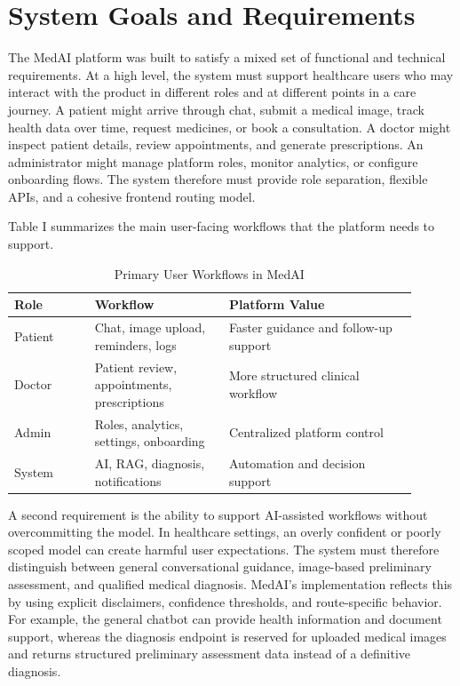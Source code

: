 \documentclass[conference]{IEEEtran}
\begin{document}
\section{System Goals and Requirements}
The MedAI platform was built to satisfy a mixed set of functional and technical requirements. At a high level, the system must support healthcare users who may interact with the product in different roles and at different points in a care journey. A patient might arrive through chat, submit a medical image, track health data over time, request medicines, or book a consultation. A doctor might inspect patient details, review appointments, and generate prescriptions. An administrator might manage platform roles, monitor analytics, or configure onboarding flows. The system therefore must provide role separation, flexible APIs, and a cohesive frontend routing model.

Table I summarizes the main user-facing workflows that the platform needs to support.

\begin{table}[H]
\centering
\caption{Primary User Workflows in MedAI}
\label{tab:user-workflows}
\begin{tabular}{p{0.18\linewidth} p{0.30\linewidth} p{0.42\linewidth}}
\toprule
\textbf{Role} & \textbf{Workflow} & \textbf{Platform Value} \\
\midrule
Patient & Chat, image upload, reminders, logs & Faster guidance and follow-up support \\
Doctor & Patient review, appointments, prescriptions & More structured clinical workflow \\
Admin & Roles, analytics, settings, onboarding & Centralized platform control \\
System & AI, RAG, diagnosis, notifications & Automation and decision support \\
\bottomrule
\end{tabular}
\end{table}

A second requirement is the ability to support AI-assisted workflows without overcommitting the model. In healthcare settings, an overly confident or poorly scoped model can create harmful user expectations. The system must therefore distinguish between general conversational guidance, image-based preliminary assessment, and qualified medical diagnosis. MedAI’s implementation reflects this by using explicit disclaimers, confidence thresholds, and route-specific behavior. For example, the general chatbot can provide health information and document support, whereas the diagnosis endpoint is reserved for uploaded medical images and returns structured preliminary assessment data instead of a definitive diagnosis.
\end{document}

